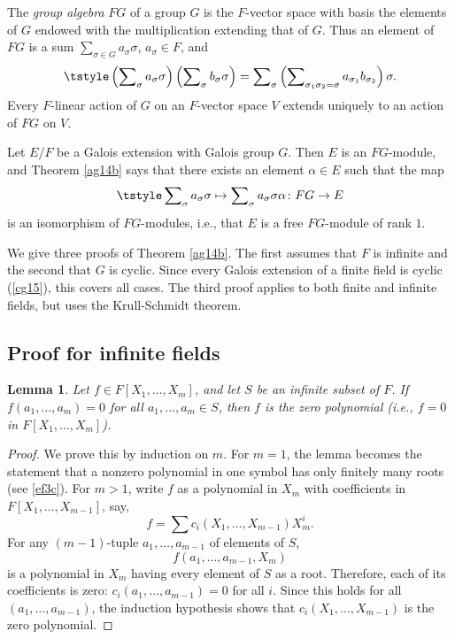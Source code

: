 \documentclass[a4paper,11pt,final,openany]{memoir}
\newtheorem{lemma}[X]{Lemma}
\theoremstyle{nonumberplain}
\newtheorem{proof}{Proof.}
\begin{document}
The%
\emph{group algebra} $FG$ of a group $G$ is the $F$-vector space with basis
the elements of $G$ endowed with the multiplication extending that of $G$.
Thus an element of $FG$ is a sum $\sum_{\sigma\in G}a_{\sigma}\sigma$,
$a_{\sigma}\in F$, and
\[
\tstyle\left(  \sum\nolimits_{\sigma}a_{\sigma}\sigma\right)  \left(
\sum\nolimits_{\sigma}b_{\sigma}\sigma\right)  =\sum\nolimits_{\sigma}\left(
\sum\nolimits_{\sigma_{1}\sigma_{2}=\sigma}a_{\sigma_{1}}b_{\sigma_{2}%
}\right)  \sigma.
\]
Every $F$-linear action of $G$ on an $F$-vector space $V$ extends uniquely to
an action of $FG$ on $V$.

Let $E/F$ be a Galois extension with Galois group $G$. Then $E$ is an
$FG$-module, and Theorem \ref{ag14b} says that there exists an element
$\alpha\in E$ such that the map%
\[
\tstyle\sum\nolimits_{\sigma}a_{\sigma}\sigma\mapsto\sum\nolimits_{\sigma
}a_{\sigma}\sigma\alpha\colon FG\rightarrow E
\]
is an isomorphism of $FG$-modules, i.e., that $E$ is a free $FG$-module of
rank $1.$

We give three proofs of Theorem \ref{ag14b}. The first assumes that $F$ is
infinite and the second that $G$ is cyclic. Since every Galois extension of a
finite field is cyclic (\ref{cg15}), this covers all cases. The third proof
applies to both finite and infinite fields, but uses the Krull-Schmidt theorem.

\subsection{Proof for infinite fields}

\begin{lemma}
\label{ag14c}Let $f\in F[X_{1},\ldots,X_{m}]$, and let $S$ be an infinite
subset of $F$. If $f(a_{1},\ldots,a_{m})=0$ for all $a_{1},\ldots,a_{m}\in S$,
then $f$ is the zero polynomial (i.e., $f=0$ in $F[X_{1},\ldots,X_{m}]$).
\end{lemma}

\begin{proof}
We prove this by induction on $m$. For $m=1$, the lemma becomes the statement
that a nonzero polynomial in one symbol has only finitely many roots (see
\ref{ef3c}). For $m>1$, write $f$ as a polynomial in $X_{m}$ with coefficients
in $F[X_{1},\ldots,X_{m-1}]$, say,
\[
f=\sum c_{i}(X_{1},\ldots,X_{m-1})X_{m}^{i}.
\]
For any $(m-1)$-tuple $a_{1},\ldots,a_{m-1}$ of elements of $S$,%
\[
f(a_{1},\ldots,a_{m-1},X_{m})
\]
is a polynomial in $X_{m}$ having every element of $S$ as a root. Therefore,
each of its coefficients is zero: $c_{i}(a_{1},\ldots,a_{m-1})=0$ for all $i$.
Since this holds for all $(a_{1},\ldots,a_{m-1})$, the induction hypothesis
shows that $c_{i}(X_{1},\ldots,X_{m-1})$ is the zero polynomial.
\end{proof}
\end{document}
